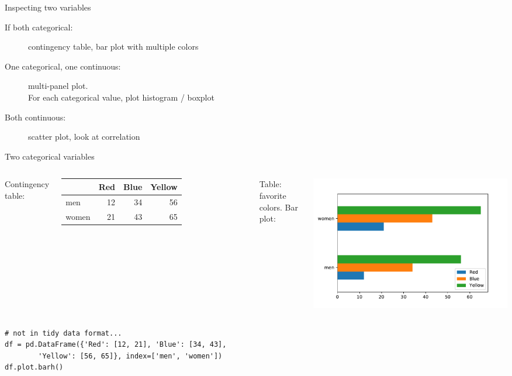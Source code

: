 \documentclass[aspectratio=169,usenames,dvipsnames]{beamer}
\begin{document}
\begin{frame}{Inspecting two variables}
\begin{description}
    \item[If both categorical:]
            contingency table, bar plot with multiple colors
    \item[One categorical, one continuous:] multi-panel plot.\\
            For each categorical value, plot histogram / boxplot
    \item[Both continuous:]
         scatter plot, look at correlation
\end{description}
\end{frame}

\begin{frame}[fragile]{Two categorical variables}
    \begin{columns}[T]
            Contingency table:
            \vspace{1em}

            \begin{tabular}{lrrr}
                & Red & Blue & Yellow \\ \midrule
            men   & 12  & 34 & 56 \\
            women & 21  & 43 & 65 \\
            \end{tabular}

            \vspace{1em}
            Table: favorite colors.
            Bar plot:

            \includegraphics[width=\linewidth]{fig/barcatcont}
    \end{columns}
\begin{lstlisting}
# not in tidy data format...
df = pd.DataFrame({'Red': [12, 21], 'Blue': [34, 43],
        'Yellow': [56, 65]}, index=['men', 'women'])
df.plot.barh()
\end{lstlisting}
\end{frame}
\end{document}
